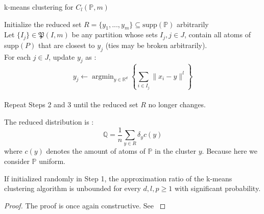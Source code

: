 \documentclass{amsart}
\newcommand{\argmin}{\mathop{\arg\min}}
\newcommand{\RR}{\mathbb{R}}
\begin{document}
\begin{algorithm}
    \caption{k-means clustering for $C_l\left(\mathbb{P},m\right)$}
    Initialize the reduced set $R=\{y_1,...,y_m\} \subseteq \text{supp}\left(\mathbb{P}\right)$ arbitrarily \\ Let $\{I_j\}\in\mathfrak{P}\left(I,m\right)$ be any partition whose sets $I_j, j\in J$, contain all atoms of supp$\left(P\right)$ that are closest to $y_j$ (ties may be broken arbitrarily). \\ For each $j\in J$, update $y_j$ as : $$y_j \gets \argmin_{y\in\RR^d} \left\{ \sum_{i\in I_j}\lVert x_i-y\rVert^l\right\}$$ \\ Repeat Steps 2 and 3 until the reduced set $R$ no longer changes.
\end{algorithm}
The reduced distribution is :
$$
\mathbb{Q}=\frac{1}{n}\sum_{y\in R}\delta_{y}c\left(y\right)
$$
where $ c\left(y\right)$ denotes the amount of atoms of $\mathbb{P}$ in the cluster $y$. Because here we consider $\mathbb{P}$ uniform.
\begin{theorem}
    If initialized randomly in Step 1, the approximation ratio of the k-means clustering algorithm is unbounded for every $d,l,p\geq1$ with significant probability.
\end{theorem}
\begin{proof}
    The proof is once again constructive. See \cite[Theorem 8]{rujeerapaiboon_scenario_2022}
\end{proof}
\end{document}
